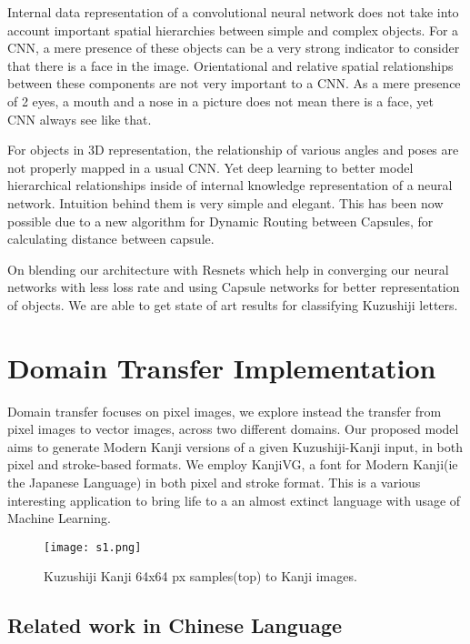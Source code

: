 \documentclass[12pt]{report}
\begin{document}
Internal data representation of a convolutional neural network does
not take into account important spatial hierarchies between simple and
complex objects. For a CNN, a mere presence of these objects can be a
very strong indicator to consider that there is a face in the image.
Orientational and relative spatial relationships between these
components are not very important to a CNN. As a mere presence of 2
eyes, a mouth and a nose in a picture does not mean there is a face,
yet CNN always see like that.

For objects in 3D representation, the relationship of various angles
and poses are not properly mapped in a usual CNN. Yet  deep learning
to better model hierarchical relationships inside of internal
knowledge representation of a neural network. Intuition behind them is
very simple and elegant. This has been now possible due to a new
algorithm for Dynamic Routing between Capsules, for calculating
distance between capsule.


On blending our architecture with Resnets which help in converging our
neural networks with less loss rate and using Capsule networks for
better representation of objects. We are able to get state of art
results for classifying Kuzushiji letters.




\chapter {Domain Transfer  Implementation}

Domain transfer focuses on pixel images, we explore instead the
transfer from pixel images to vector images, across two different
domains. Our proposed model aims to generate Modern Kanji versions of
a given Kuzushiji-Kanji input, in both pixel and stroke-based formats.
We employ KanjiVG, a font for Modern Kanji(ie the Japanese Language)
in both pixel and stroke format. This is a various interesting
application to bring life to a an almost extinct language with usage
of Machine
Learning.

\begin{figure}[h]
\centering
\texttt{[image: s1.png]}
\caption{Kuzushiji Kanji 64x64 px samples(top) to Kanji images.}
\end{figure}

\section{Related work in Chinese Language}
\end{document}
